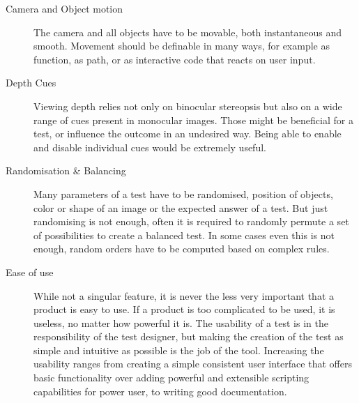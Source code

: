 \begin{description}
\item[Camera and Object motion]
The camera and all objects have to be movable, both instantaneous and smooth.
Movement should be definable in many ways, for example as function, as path, or as interactive code that reacts on user input.

\item[Depth Cues]
Viewing depth relies not only on binocular stereopsis but also on a wide range of cues present in monocular images.
Those might be beneficial for a test, or influence the outcome in an undesired way.
Being able to enable and disable individual cues would be extremely useful.

\item[Randomisation \& Balancing]
Many parameters of a test have to be randomised, position of objects, color or shape of an image or the expected answer of a test.
But just randomising is not enough, often it is required to randomly permute a set of possibilities to create a balanced test.
In some cases even this is not enough, random orders have to be computed based on complex rules.

\item[Ease of use]
While not a singular feature, it is never the less very important that a product is easy to use.
If a product is too complicated to be used, it is useless, no matter how powerful it is.
The usability of a test is in the responsibility of the test designer, but making the creation of the test as simple and intuitive as possible is the job of the tool.
Increasing the usability ranges from creating a simple consistent user interface that offers basic functionality over adding powerful and extensible scripting capabilities for power user, to writing good documentation.
\end{description}
